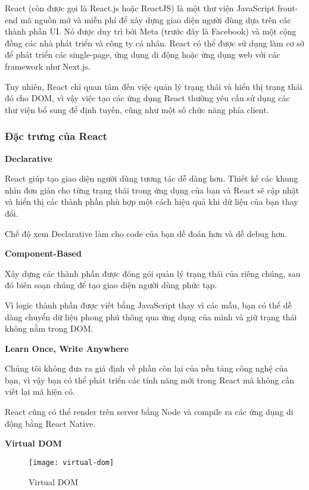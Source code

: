 React (còn được gọi là React.js hoặc ReactJS) là một thư viện JavaScript front-end mã nguồn mở và miễn phí để xây dựng giao diện người dùng dựa trên các thành phần UI. Nó được duy trì bởi Meta (trước đây là Facebook) và một cộng đồng các nhà phát triển và công ty cá nhân. React có thể được sử dụng làm cơ sở để phát triển các single-page, ứng dụng di động hoặc ứng dụng web với các framework như Next.js.

Tuy nhiên, React chỉ quan tâm đến việc quản lý trạng thái và hiển thị trạng thái đó cho DOM, vì vậy việc tạo các ứng dụng React thường yêu cầu sử dụng các thư viện bổ sung để định tuyến, cũng như một số chức năng phía client.

\subsubsection{Đặc trưng của React}

\textbf{Declarative}

React giúp tạo giao diện người dùng tương tác dễ dàng hơn. Thiết kế các khung nhìn đơn giản cho từng trạng thái trong ứng dụng của bạn và React sẽ cập nhật và hiển thị các thành phần phù hợp một cách hiệu quả khi dữ liệu của bạn thay đổi.

Chế độ xem Declarative làm cho code của bạn dễ đoán hơn và dễ debug hơn.

\textbf{Component-Based}

Xây dựng các thành phần được đóng gói quản lý trạng thái của riêng chúng, sau đó biên soạn chúng để tạo giao diện người dùng phức tạp.

Vì logic thành phần được viết bằng JavaScript thay vì các mẫu, bạn có thể dễ dàng chuyển dữ liệu phong phú thông qua ứng dụng của mình và giữ trạng thái không nằm trong DOM.

\textbf{Learn Once, Write Anywhere}

Chúng tôi không đưa ra giả định về phần còn lại của nền tảng công nghệ của bạn, vì vậy bạn có thể phát triển các tính năng mới trong React mà không cần viết lại mã hiện có.

React cũng có thể render trên server bằng Node và compile ra các ứng dụng di động bằng React Native.

\textbf{Virtual DOM}

\begin{figure}[H]
	\centering
	\texttt{[image: virtual-dom]}
	\caption{Virtual DOM}
\end{figure}

